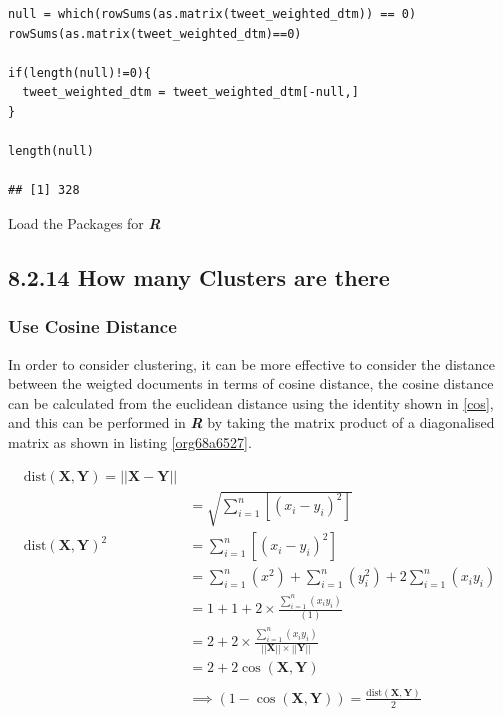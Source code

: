 \documentclass[11pt]{article}
\begin{document}
\begin{listing}[htbp]
\begin{verbatim}
null = which(rowSums(as.matrix(tweet_weighted_dtm)) == 0)
rowSums(as.matrix(tweet_weighted_dtm)==0)

if(length(null)!=0){
  tweet_weighted_dtm = tweet_weighted_dtm[-null,]
}

length(null)

## [1] 328
\end{verbatim}
\caption{\label{orga62b927}Load the Packages for \textbf{\textbf{\emph{R}}}}
\end{listing}
\subsection{8.2.14 How many Clusters are there}
\label{sec:orge0fda59}
\subsubsection{Use Cosine Distance}
\label{sec:org315eb9a}
In order to consider clustering, it can be more effective to consider the distance between the weigted documents in terms of cosine distance, the cosine distance can be calculated from the euclidean distance using the identity shown in \eqref{cos}, and this can be performed in \textbf{\emph{R}} by taking the matrix product of a diagonalised matrix as shown in listing \ref{org68a6527}.

\begin{align}
\mathrm{dist}\left( \mathbf{X}, \mathbf{Y} \right)= \left| \left| \mathbf{X}-\mathbf{Y} \right| \right| \\
&= \sqrt{\sum^{n}_{i= 1}   \left[ \left( x_i-y_i \right)^2 \right] } \\
\mathrm{dist}\left( \mathbf{X}, \mathbf{Y} \right)^2&= \sum^{n}_{i= 1}  \left[ \left( x_i-y_i \right)^2 \right] \\
&= \sum^{n}_{i= 1}   \left( x^2 \right)+  \sum^{n}_{i= 1}   \left( y_i^2 \right)+ 2 \sum^{n}_{i= 1}   \left( x_iy_i \right) \\
&= 1+ 1 +  2 \times  \frac{\sum^{n}_{i= 1}   \left( x_iy_i \right)}{\left( 1 \right) }\\
&= 2+ 2\times \frac{\sum^{n}_{i= 1}   \left( x_iy_i \right)}{\left| \left| \mathbf{X} \right| \right|\times \left| \left| \mathbf{Y} \right| \right|}\\
&= 2+ 2 \cos\left( \mathbf{X}, \mathbf{Y} \right)\\
\ \\
& \implies  \left( 1- \cos\left( \mathbf{X}, \mathbf{Y} \right) \right) = \frac{\mathrm{dist}\left( \mathbf{X}, \mathbf{Y} \right)}{2} \label{cos}
\end{align}
\end{document}
